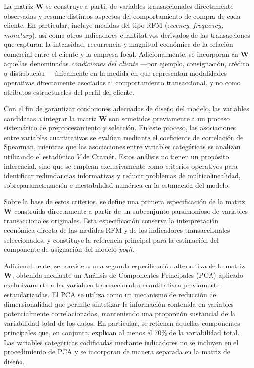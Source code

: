     La matriz $\mathbf{W}$ se construye a partir de variables transaccionales directamente observadas y resume distintos aspectos del comportamiento de compra de cada cliente. En particular, incluye medidas del tipo RFM (\emph{recency, frequency, monetary}), así como otros indicadores cuantitativos derivados de las transacciones que capturan la intensidad, recurrencia y magnitud económica de la relación comercial entre el cliente y la empresa focal. Adicionalmente, se incorporan en $\mathbf{W}$ aquellas denominadas \emph{condiciones del cliente} —por ejemplo, consignación, crédito o distribución— únicamente en la medida en que representan modalidades operativas directamente asociadas al comportamiento transaccional, y no como atributos estructurales del perfil del cliente.
    
    Con el fin de garantizar condiciones adecuadas de diseño del modelo, las variables candidatas a integrar la matriz $\mathbf{W}$ son sometidas previamente a un proceso sistemático de preprocesamiento y selección. En este proceso, las asociaciones entre variables cuantitativas se evalúan mediante el coeficiente de correlación de Spearman, mientras que las asociaciones entre variables categóricas se analizan utilizando el estadístico $V$ de Cramér. Estos análisis no tienen un propósito inferencial, sino que se emplean exclusivamente como criterios operativos para identificar redundancias informativas y reducir problemas de multicolinealidad, sobreparametrización e inestabilidad numérica en la estimación del modelo.
    
    Sobre la base de estos criterios, se define una primera especificación de la matriz $\mathbf{W}$ construida directamente a partir de un subconjunto parsimonioso de variables transaccionales originales. Esta especificación conserva la interpretación económica directa de las medidas RFM y de los indicadores transaccionales seleccionados, y constituye la referencia principal para la estimación del componente de asignación del modelo \emph{pogit}.
    
    Adicionalmente, se considera una segunda especificación alternativa de la matriz $\mathbf{W}$, obtenida mediante un Análisis de Componentes Principales (PCA) aplicado exclusivamente a las variables transaccionales cuantitativas previamente estandarizadas. El PCA se utiliza como un mecanismo de reducción de dimensionalidad que permite sintetizar la información contenida en variables potencialmente correlacionadas, manteniendo una proporción sustancial de la variabilidad total de los datos. En particular, se retienen aquellas componentes principales que, en conjunto, explican al menos el 70\% de la variabilidad total. Las variables categóricas codificadas mediante indicadores no se incluyen en el procedimiento de PCA y se incorporan de manera separada en la matriz de diseño.
    
